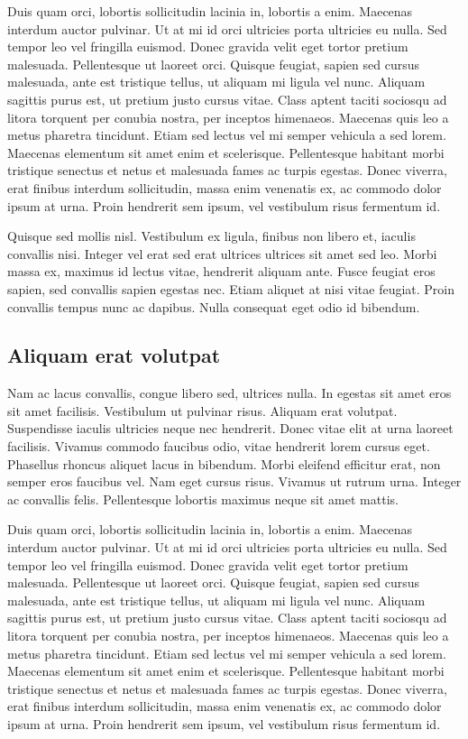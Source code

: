 \documentclass[a4paper,10pt]{report}
\begin{document}
Duis quam orci, lobortis sollicitudin lacinia in, lobortis a enim. Maecenas interdum auctor pulvinar.
Ut at mi id orci ultricies porta ultricies eu nulla. Sed tempor leo vel fringilla euismod. Donec gravida velit
eget tortor pretium malesuada. Pellentesque ut laoreet orci. Quisque feugiat, sapien sed cursus malesuada,
ante est tristique tellus, ut aliquam mi ligula vel nunc. Aliquam sagittis purus est, ut pretium justo cursus vitae.
Class aptent taciti sociosqu ad litora torquent per conubia nostra, per inceptos himenaeos.
Maecenas quis leo a metus pharetra tincidunt. Etiam sed lectus vel mi semper vehicula a sed lorem.
Maecenas elementum sit amet enim et scelerisque.
Pellentesque habitant morbi tristique senectus et netus et malesuada fames ac turpis egestas.
Donec viverra, erat finibus interdum sollicitudin, massa enim venenatis ex, ac commodo dolor ipsum at urna.
Proin hendrerit sem ipsum, vel vestibulum risus fermentum id.

Quisque sed mollis nisl. Vestibulum ex ligula, finibus non libero et, iaculis convallis nisi.
Integer vel erat sed erat ultrices ultrices sit amet sed leo. Morbi massa ex, maximus id lectus vitae,
hendrerit aliquam ante. Fusce feugiat eros sapien, sed convallis sapien egestas nec. Etiam aliquet at
nisi vitae feugiat. Proin convallis tempus nunc ac dapibus. Nulla consequat eget odio id bibendum.

\subsection{Aliquam erat volutpat}

Nam ac lacus convallis, congue libero sed, ultrices nulla. In egestas sit amet eros sit amet facilisis.
Vestibulum ut pulvinar risus. Aliquam erat volutpat. Suspendisse iaculis ultricies neque nec hendrerit.
Donec vitae elit at urna laoreet facilisis. Vivamus commodo faucibus odio, vitae hendrerit lorem cursus eget.
Phasellus rhoncus aliquet lacus in bibendum. Morbi eleifend efficitur erat, non semper eros faucibus vel.
Nam eget cursus risus. Vivamus ut rutrum urna. Integer ac convallis felis.
Pellentesque lobortis maximus neque sit amet mattis.

Duis quam orci, lobortis sollicitudin lacinia in, lobortis a enim. Maecenas interdum auctor pulvinar.
Ut at mi id orci ultricies porta ultricies eu nulla. Sed tempor leo vel fringilla euismod. Donec gravida velit
eget tortor pretium malesuada. Pellentesque ut laoreet orci. Quisque feugiat, sapien sed cursus malesuada,
ante est tristique tellus, ut aliquam mi ligula vel nunc. Aliquam sagittis purus est, ut pretium justo cursus vitae.
Class aptent taciti sociosqu ad litora torquent per conubia nostra, per inceptos himenaeos.
Maecenas quis leo a metus pharetra tincidunt. Etiam sed lectus vel mi semper vehicula a sed lorem.
Maecenas elementum sit amet enim et scelerisque.
Pellentesque habitant morbi tristique senectus et netus et malesuada fames ac turpis egestas.
Donec viverra, erat finibus interdum sollicitudin, massa enim venenatis ex, ac commodo dolor ipsum at urna.
Proin hendrerit sem ipsum, vel vestibulum risus fermentum id.
\end{document}
